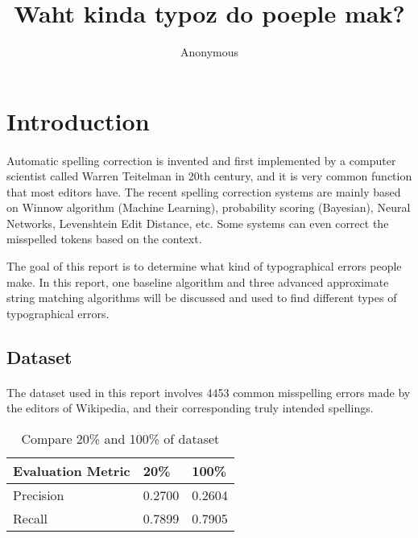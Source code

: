 \documentclass[11pt]{article}
\title{Waht kinda typoz do poeple mak?}
\author
{Anonymous}
\begin{document}
\maketitle

\section{Introduction}

\paragraph{} 

Automatic spelling correction is invented and first implemented by a computer scientist called Warren Teitelman in 20th century, and it is very common function that most editors have. The recent spelling correction systems are mainly based on Winnow algorithm (Machine Learning), probability scoring (Bayesian), Neural Networks, Levenshtein Edit Distance, etc. Some systems can even correct the misspelled tokens based on the context. \cite{Mays:1991:CBS:117644.117651} 

The goal of this report is to determine what kind of typographical errors people make. In this report, one baseline algorithm and three advanced approximate string matching algorithms will be discussed and used to find different types of typographical errors.

\subsection{Dataset}

\paragraph{} The dataset used in this report involves 4453 common misspelling errors made by the editors of Wikipedia\cite{WikiMisspell}, and their corresponding truly intended spellings.

\begin{table}[!htbp]
 \begin{center}
\begin{tabular}{| l | l | l |}

      \hline
      Evaluation Metric & 20\% & 100\% \\
      \hline\hline
      Precision & 0.2700 & 0.2604 \\
      Recall & 0.7899 & 0.7905 \\
      \hline

\end{tabular}
\caption{Compare 20\% and 100\% of dataset}\label{table1}
 \end{center}
\end{table}
\end{document}
